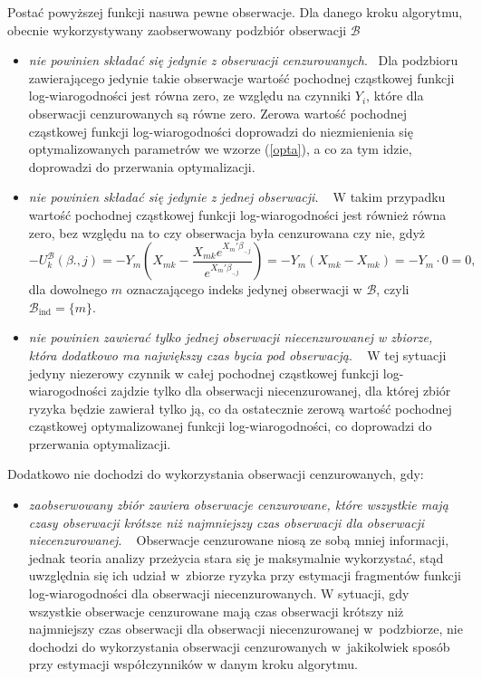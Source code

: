 Postać powyższej funkcji nasuwa pewne obserwacje. Dla danego kroku algorytmu, obecnie wykorzystywany zaobserwowany podzbiór obserwacji \(\mathcal{B}\)
\begin{itemize}
\item \textit{nie powinien składać się jedynie z obserwacji cenzurowanych}. \newline \ \newline Dla podzbioru zawierającego jedynie takie obserwacje wartość pochodnej cząstkowej funkcji log-wiarogodności jest równa zero, ze względu na czynniki $Y_i$, które dla obserwacji cenzurowanych są równe zero. Zerowa wartość pochodnej cząstkowej funkcji log-wiarogodności doprowadzi do niezmienienia się optymalizowanych parametrów we wzorze (\ref{opta}), a co za tym idzie, doprowadzi do przerwania optymalizacji.
\item \textit{nie powinien składać się jedynie z jednej obserwacji}. \newline \ \newline  
W takim przypadku wartość pochodnej cząstkowej funkcji log-wiarogodności jest również równa zero, bez względu na to czy obserwacja była cenzurowana czy nie, gdyż 
$$-U_{k}^{\mathcal{B}}(\beta{.,j})=-Y_m\left(X_{mk}-\dfrac{ X_{mk} e^{X_m'\beta_{.,j}}}{ e^{X_m'\beta_{.,j}}}\right) = -Y_m\left(X_{mk}-X_{mk}\right) = -Y_m \cdot 0 = 0,$$
dla dowolnego $m$ oznaczającego indeks jedynej obserwacji w $\mathcal{B}$, czyli $\mathcal{B}_{\text{ind}}=\{m\}$. 
\item \textit{nie powinien zawierać tylko jednej obserwacji niecenzurowanej w zbiorze, która dodatkowo ma największy czas bycia pod obserwacją}. \newline \ \newline 
W tej sytuacji jedyny niezerowy czynnik w całej pochodnej cząstkowej funkcji log-wiarogodności zajdzie tylko dla obserwacji niecenzurowanej, dla której zbiór ryzyka będzie zawierał tylko ją, co da ostatecznie zerową wartość pochodnej cząstkowej optymalizowanej funkcji log-wiarogodności, co doprowadzi do przerwania optymalizacji.
\end{itemize}

Dodatkowo nie dochodzi do wykorzystania obserwacji cenzurowanych, gdy:
\begin{itemize}
\item \textit{zaobserwowany zbiór zawiera obserwacje cenzurowane, które wszystkie mają czasy obserwacji krótsze niż najmniejszy czas obserwacji dla obserwacji niecenzurowanej}. \newline \ \newline 
Obserwacje cenzurowane niosą ze sobą mniej informacji, jednak teoria analizy przeżycia stara się je maksymalnie wykorzystać, stąd uwzględnia się ich udział w~zbiorze ryzyka przy estymacji fragmentów funkcji log-wiarogodności dla obserwacji niecenzurowanych. W sytuacji, gdy wszystkie obserwacje cenzurowane mają czas obserwacji krótszy niż najmniejszy czas obserwacji dla obserwacji niecenzurowanej w~podzbiorze, nie dochodzi do wykorzystania obserwacji cenzurowanych w~jakikolwiek sposób przy estymacji współczynników w danym kroku algorytmu.
\end{itemize}

